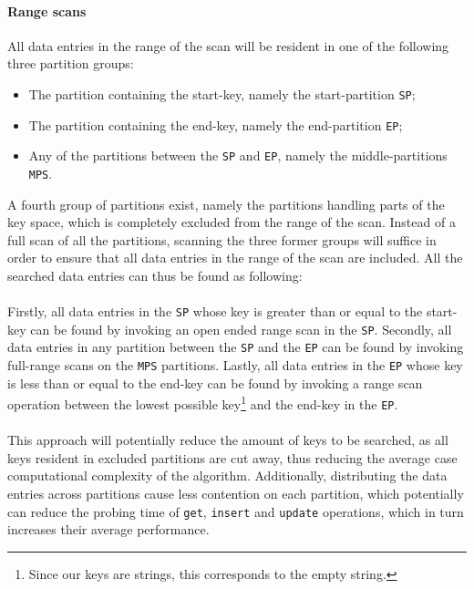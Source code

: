 \documentclass[11pt]{report} %
\begin{document}
\paragraph{Range scans} All data entries in the range of the scan will be resident in one of the following three partition groups:
\begin{itemize}[noitemsep]
  \item The partition containing the start-key, namely the start-partition \verb|SP|;
  \item The partition containing the end-key, namely the end-partition \verb|EP|;
  \item Any of the partitions between the \verb|SP| and \verb|EP|, namely the middle-partitions \verb|MPS|.
\end{itemize}
A fourth group of partitions exist, namely the partitions handling parts of the key space, which is completely excluded from the range of the scan. Instead of a full scan of all the partitions, scanning the three former groups will suffice in order to ensure that all data entries in the range of the scan are included. All the searched data entries can thus be found as following:\\
\\
Firstly, all data entries in the \verb|SP| whose key is greater than or equal to the start-key can be found by invoking an open ended range scan in the \verb|SP|. Secondly, all data entries in any partition between the \verb|SP| and the \verb|EP| can be found by invoking full-range scans on the \verb|MPS| partitions. Lastly, all data entries in the \verb|EP| whose key is less than or equal to the end-key can be found by invoking a range scan operation between the lowest possible key\footnote{Since our keys are strings, this corresponds to the empty string.} and the end-key in the \verb|EP|.\\
\\
This approach will potentially reduce the amount of keys to be searched, as all keys resident in excluded partitions are cut away, thus reducing the average case computational complexity of the algorithm. Additionally, distributing the data entries across partitions cause less contention on each partition, which potentially can reduce the probing time of \verb|get|, \verb|insert| and \verb|update| operations, which in turn increases their average performance.

\end{document}
